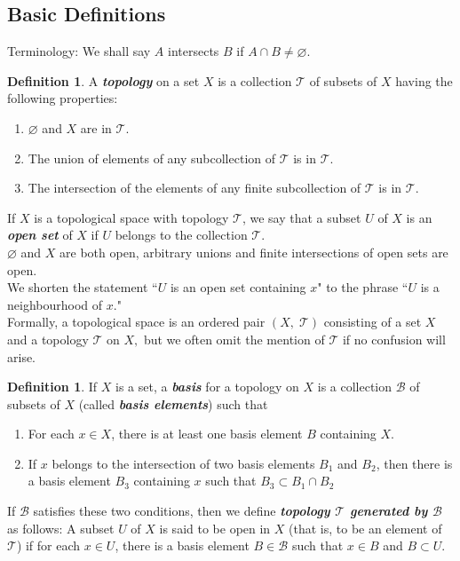 \documentclass{article}
\theoremstyle{definition}
\newtheorem{defn}[theorem]{Definition}
\let\emptyset\varnothing
\begin{document}
\subsection{Basic Definitions}
Terminology: We shall say $A$ intersects $B$ if $A\cap B \neq \emptyset$.
\begin{defn}
  A \textbf{\emph{topology}} on a set $X$ is a collection $\mathcal{T}$ of subsets of $X$ having the following properties:
  \begin{enumerate}[nosep] 
    \item $\emptyset$ and $X$ are in $\mathcal{T}.$
    \item The union of elements of any subcollection of $\mathcal{T}$ is in $\mathcal{T}.$
    \item The intersection of the elements of any finite subcollection of $\mathcal{T}$ is in $\mathcal{T}.$
  \end{enumerate}
\end{defn}
If $X$ is a topological space with topology $\mathcal{T}$, we say that a subset $U$ of $X$ is an \textbf{\emph{open set}} of $X$ if $U$ belongs to the collection $\mathcal{T}.$\\
$\emptyset$ and $X$ are both open, arbitrary unions and finite intersections of open sets are open.\\
We shorten the statement ``$U$ is an open set containing $x$" to the phrase ``$U$ is a neighbourhood of $x.$"\\
Formally, a topological space is an ordered pair $(X,\;\mathcal{T})$ consisting of a set $X$ and a topology $\mathcal{T}$ on $X,$ but we often omit the mention of $\mathcal{T}$ if no confusion will arise.
%
\begin{defn}
  If $X$ is a set, a \textbf{\emph{basis}} for a topology on $X$ is a collection $\mathcal{B}$ of subsets of $X$ (called \textbf{\emph{basis elements}}) such that
  \begin{enumerate}[nosep] 
    \item For each $x\in X$, there is at least one basis element $B$ containing $X.$
    \item If $x$ belongs to the intersection of two basis elements $B_1$ and $B_2$, then there is a basis element $B_3$ containing $x$ such that $B_3\subset B_1 \cap B_2$
  \end{enumerate}
\end{defn}
If $\mathcal{B}$ satisfies these two conditions, then we define \textbf{\emph{topology $\mathcal{T}$ generated by $\mathcal{B}$}} as follows: A subset $U$ of $X$ is said to be open in $X$ (that is, to be an element of $\mathcal{T}$) if for each $x\in U$, there is a basis element $B\in\mathcal{B}$ such that $x\in B$ and $B\subset U.$\\
\end{document}

